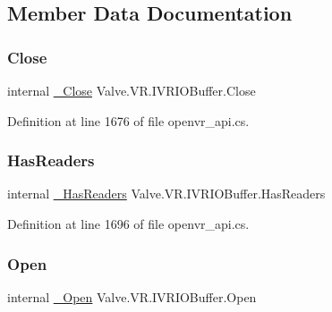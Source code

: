 \subsection{Member Data Documentation}
\mbox{\label{struct_valve_1_1_v_r_1_1_i_v_r_i_o_buffer_a6e5984e04b851d1a0ec667f57435bfa6}} 
\subsubsection{\texorpdfstring{Close}{Close}}
{\footnotesize\ttfamily internal \mbox{\hyperlink{struct_valve_1_1_v_r_1_1_i_v_r_i_o_buffer_a3c467ee9ea9833cef96b30c7dbbd933d}{\+\_\+\+Close}} Valve.\+V\+R.\+I\+V\+R\+I\+O\+Buffer.\+Close}



Definition at line 1676 of file openvr\+\_\+api.\+cs.

\mbox{\label{struct_valve_1_1_v_r_1_1_i_v_r_i_o_buffer_ad81daaba6ab6af0d8c4b67d9349170b3}} 
\subsubsection{\texorpdfstring{HasReaders}{HasReaders}}
{\footnotesize\ttfamily internal \mbox{\hyperlink{struct_valve_1_1_v_r_1_1_i_v_r_i_o_buffer_a6a33628dafbef18c06553fe1ba31e8cc}{\+\_\+\+Has\+Readers}} Valve.\+V\+R.\+I\+V\+R\+I\+O\+Buffer.\+Has\+Readers}



Definition at line 1696 of file openvr\+\_\+api.\+cs.

\mbox{\label{struct_valve_1_1_v_r_1_1_i_v_r_i_o_buffer_afa5dd11baf2340160cdd72fb38c4e384}} 
\subsubsection{\texorpdfstring{Open}{Open}}
{\footnotesize\ttfamily internal \mbox{\hyperlink{struct_valve_1_1_v_r_1_1_i_v_r_i_o_buffer_a95ed10b524750552d8ae33a0ed369da2}{\+\_\+\+Open}} Valve.\+V\+R.\+I\+V\+R\+I\+O\+Buffer.\+Open}



